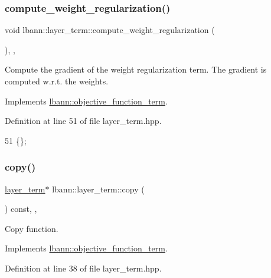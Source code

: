 \subsubsection{\texorpdfstring{compute\+\_\+weight\+\_\+regularization()}{compute\_weight\_regularization()}}
{\footnotesize\ttfamily void lbann\+::layer\+\_\+term\+::compute\+\_\+weight\+\_\+regularization (\begin{DoxyParamCaption}{ }\end{DoxyParamCaption})\hspace{0.3cm}{\ttfamily [inline]}, {\ttfamily [override]}, {\ttfamily [virtual]}}

Compute the gradient of the weight regularization term. The gradient is computed w.\+r.\+t. the weights. 

Implements \hyperlink{classlbann_1_1objective__function__term_a134cf89caed45527bbe9d811a0b93dfc}{lbann\+::objective\+\_\+function\+\_\+term}.



Definition at line 51 of file layer\+\_\+term.\+hpp.


\begin{DoxyCode}
51 \{\};
\end{DoxyCode}
\mbox{\label{classlbann_1_1layer__term_a20820da7fd752572579a2dbaaae2ed24}} 
\subsubsection{\texorpdfstring{copy()}{copy()}}
{\footnotesize\ttfamily \hyperlink{classlbann_1_1layer__term}{layer\+\_\+term}$\ast$ lbann\+::layer\+\_\+term\+::copy (\begin{DoxyParamCaption}{ }\end{DoxyParamCaption}) const\hspace{0.3cm}{\ttfamily [inline]}, {\ttfamily [override]}, {\ttfamily [virtual]}}

Copy function. 

Implements \hyperlink{classlbann_1_1objective__function__term_ae98a4ec173a602ad55d1df20dadd4cb9}{lbann\+::objective\+\_\+function\+\_\+term}.



Definition at line 38 of file layer\+\_\+term.\+hpp.


